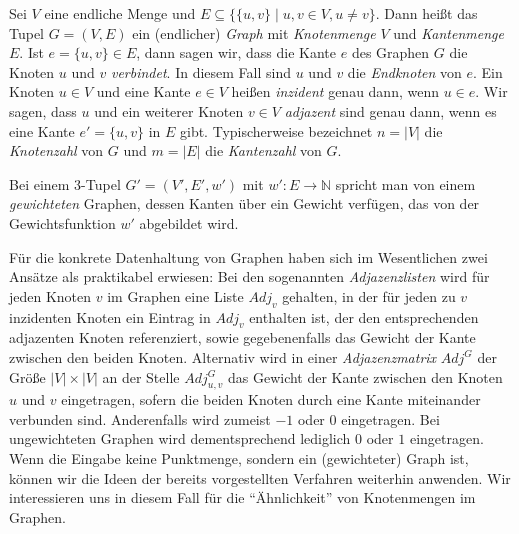 \begin{definition}[Graph]
\label{def:graph}
	Sei $V$ eine endliche Menge und $E \subseteq \{ \{ u,v \} \mid u, v \in V, u \neq v \}$.
	Dann heißt das Tupel $G = (V, E)$ ein (endlicher) \emph{Graph} mit \emph{Knotenmenge} $V$ und
	\emph{Kantenmenge} $E$. Ist $e = \{ u,v \} \in E$, dann sagen wir, dass die Kante $e$ des Graphen $G$
	die Knoten $u$ und $v$ \emph{verbindet}. In diesem Fall sind $u$ und $v$ die \emph{Endknoten}
	von $e$.
	Ein Knoten $u \in V$ und eine Kante $e \in V$ heißen \emph{inzident}
	genau dann, wenn $u \in e$. Wir sagen, dass $u$ und ein weiterer Knoten $v \in V$ \emph{adjazent}
	sind genau dann, wenn es eine Kante $e' = \{ u,v \}$ in $E$ gibt.
	Typischerweise bezeichnet $n = \left|V\right|$ die \emph{Knotenzahl} von $G$ und
	$m = \left|E\right|$ die \emph{Kantenzahl} von $G$.
	
	Bei einem 3-Tupel $G' = (V', E', w')$ mit $w' : E \rightarrow \mathbb{N}$ spricht man von einem \emph{gewichteten} Graphen,
	dessen Kanten über ein Gewicht verfügen, das von der Gewichtsfunktion $w'$ abgebildet wird.
\end{definition}
Für die konkrete Datenhaltung von Graphen haben sich im Wesentlichen zwei Ansätze als praktikabel erwiesen: Bei den sogenannten
\emph{Adjazenzlisten} wird für jeden Knoten $v$ im Graphen eine Liste $Adj_v$ gehalten, in der für jeden zu $v$ inzidenten
Knoten ein Eintrag in $Adj_v$ enthalten ist, der den entsprechenden adjazenten Knoten referenziert, sowie gegebenenfalls das
Gewicht der Kante zwischen den beiden Knoten.
Alternativ wird in einer
\emph{Adjazenzmatrix} $Adj^G$ der Größe $\left|V\right| \times \left|V\right|$ an der Stelle $Adj^G_{u,v}$ das Gewicht der Kante
zwischen den Knoten $u$ und $v$ eingetragen, sofern die beiden Knoten durch eine Kante miteinander verbunden sind.
Anderenfalls wird zumeist $-1$ oder $0$ eingetragen. Bei ungewichteten Graphen wird dementsprechend lediglich $0$ oder $1$
eingetragen.
\absatz
Wenn die Eingabe keine Punktmenge, sondern ein (gewichteter) Graph ist, können wir die Ideen der bereits vorgestellten Verfahren
weiterhin anwenden. Wir interessieren uns in diesem Fall für die "`Ähnlichkeit"' von Knotenmengen im Graphen.

